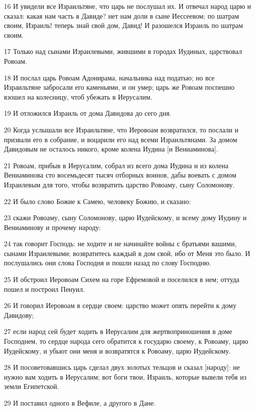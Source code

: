 \par 16 И увидели все Израильтяне, что царь не послушал их. И отвечал народ царю и сказал: какая нам часть в Давиде? нет нам доли в сыне Иессеевом; по шатрам своим, Израиль! теперь знай свой дом, Давид! И разошелся Израиль по шатрам своим.
\par 17 Только над сынами Израилевыми, жившими в городах Иудиных, царствовал Ровоам.
\par 18 И послал царь Ровоам Адонирама, начальника над податью; но все Израильтяне забросали его каменьями, и он умер; царь же Ровоам поспешно взошел на колесницу, чтоб убежать в Иерусалим.
\par 19 И отложился Израиль от дома Давидова до сего дня.
\par 20 Когда услышали все Израильтяне, что Иеровоам возвратился, то послали и призвали его в собрание, и воцарили его над всеми Израильтянами. За домом Давидовым не осталось никого, кроме колена Иудина [и Вениаминова].
\par 21 Ровоам, прибыв в Иерусалим, собрал из всего дома Иудина и из колена Вениаминова сто восемьдесят тысяч отборных воинов, дабы воевать с домом Израилевым для того, чтобы возвратить царство Ровоаму, сыну Соломонову.
\par 22 И было слово Божие к Самею, человеку Божию, и сказано:
\par 23 скажи Ровоаму, сыну Соломонову, царю Иудейскому, и всему дому Иудину и Вениаминову и прочему народу:
\par 24 так говорит Господь: не ходите и не начинайте войны с братьями вашими, сынами Израилевыми; возвратитесь каждый в дом свой, ибо от Меня это было. И послушались они слова Господня и пошли назад по слову Господню.
\par 25 И обстроил Иеровоам Сихем на горе Ефремовой и поселился в нем; оттуда пошел и построил Пенуил.
\par 26 И говорил Иеровоам в сердце своем: царство может опять перейти к дому Давидову;
\par 27 если народ сей будет ходить в Иерусалим для жертвоприношения в доме Господнем, то сердце народа сего обратится к государю своему, к Ровоаму, царю Иудейскому, и убьют они меня и возвратятся к Ровоаму, царю Иудейскому.
\par 28 И посоветовавшись царь сделал двух золотых тельцов и сказал [народу]: не нужно вам ходить в Иерусалим; вот боги твои, Израиль, которые вывели тебя из земли Египетской.
\par 29 И поставил одного в Вефиле, а другого в Дане.
